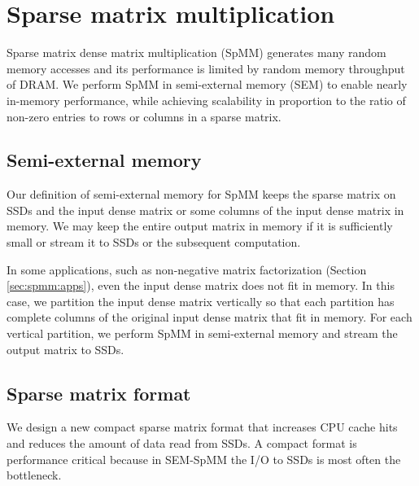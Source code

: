 \section{Sparse matrix multiplication} \label{sec:spmm}
Sparse matrix dense matrix multiplication (SpMM) generates many random memory
accesses and its performance is limited by random memory throughput
of DRAM. We perform SpMM in semi-external memory (SEM) to enable
nearly in-memory performance, while achieving scalability in proportion
to the ratio of non-zero entries to rows or columns in a sparse matrix.

\subsection{Semi-external memory}
Our definition of semi-external memory for SpMM keeps the sparse matrix on
SSDs and the input dense matrix or some columns of the input dense matrix
in memory. We may keep the entire output matrix in memory if it is sufficiently
small or stream it to SSDs or the subsequent computation.

In some applications, such as non-negative matrix factorization (Section
\ref{sec:spmm:apps}), even the input dense matrix does not fit in memory. In this case,
we partition the input dense matrix vertically so that each partition has
complete columns of the original input dense matrix that fit in memory.
For each vertical partition, we perform SpMM in semi-external memory and
stream the output matrix to SSDs.

\subsection{Sparse matrix format}
We design a new compact sparse matrix format that increases CPU cache hits and 
reduces the amount of data read from SSDs. A compact format is performance critical 
because in SEM-SpMM the I/O to SSDs is most often the bottleneck.


